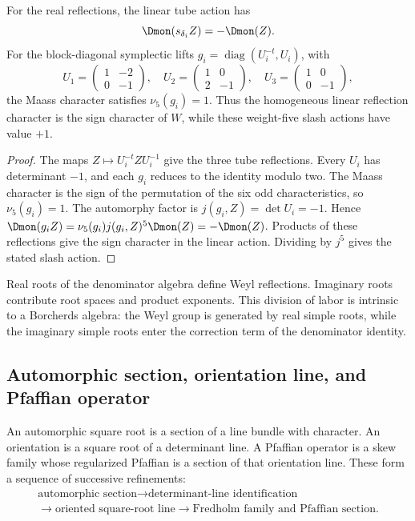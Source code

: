 \begin{proposition}
\label{comp:prop:reflection-signs}
For the real reflections, the linear tube action has
\[
 \Dmon(s_{\delta_i}Z)=-\Dmon(Z).
\]
For the block-diagonal symplectic lifts
\(g_i=\operatorname{diag}(U_i^{-t},U_i)\), with
\[
 U_1=\begin{pmatrix}1&-2\\0&-1\end{pmatrix},\quad
 U_2=\begin{pmatrix}1&0\\2&-1\end{pmatrix},\quad
 U_3=\begin{pmatrix}1&0\\0&-1\end{pmatrix},
\]
the Maass character satisfies \(\nu_5(g_i)=1\). Thus the
homogeneous linear reflection character is the sign character of
\(W\), while these weight-five slash actions have value \(+1\).
\end{proposition}
\begin{proof}
The maps \(Z\mapsto U_i^{-t}ZU_i^{-1}\) give the three tube
reflections. Every \(U_i\) has determinant \(-1\), and each
\(g_i\) reduces to the identity modulo two. The Maass character
is the sign of the permutation of the six odd characteristics,
so \(\nu_5(g_i)=1\). The automorphy factor is
\(j(g_i,Z)=\det U_i=-1\). Hence
\(\Dmon(g_iZ)=\nu_5(g_i)j(g_i,Z)^5\Dmon(Z)=-\Dmon(Z)\).
Products of these reflections give the sign character in the linear
action. Dividing by \(j^5\) gives the stated slash action.
\end{proof}

Real roots of the denominator algebra define Weyl reflections. Imaginary roots contribute root spaces and product exponents. This division of labor is intrinsic to a Borcherds algebra: the Weyl group is generated by real simple roots, while the imaginary simple roots enter the correction term of the denominator identity.

\subsection{Automorphic section, orientation line, and Pfaffian operator}
An automorphic square root is a section of a line bundle with character. An orientation is a square root of a determinant line. A Pfaffian operator is a skew family whose regularized Pfaffian is a section of that orientation line. These form a sequence of successive refinements:
\[
\begin{gathered}
 \text{automorphic section}
 \longrightarrow \text{determinant-line identification}\\
 \longrightarrow \text{oriented square-root line}
 \longrightarrow \text{Fredholm family and Pfaffian section}.
\end{gathered}
\]


